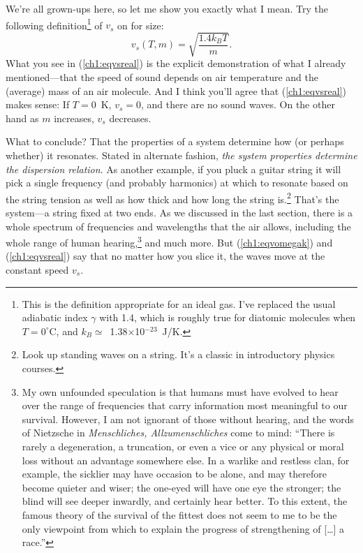 We're all grown-ups here, so let me show you exactly what I mean. Try
the following definition\footnote{This is the definition appropriate for an
  ideal gas. I've replaced the usual adiabatic index $\gamma$ with 1.4, which is
  roughly true for diatomic molecules when $T = 0 ^{\circ}$C, and
  $k_B \simeq$~1.38$\times$10$^{-23}$~J/K.} of $v_s$ on for size:
\begin{equation}
  \label{ch1:eqvsreal}
  v_s (T,m) = \sqrt{\dfrac{1.4 k_B T}{m}}.
\end{equation}
What you see in (\ref{ch1:eqvsreal}) is the explicit demonstration of what I
already mentioned---that the speed of sound depends on air temperature and the
(average) mass of an air molecule. And I think you'll agree that
(\ref{ch1:eqvsreal}) makes sense: If $T = 0$~K, $v_s = 0$, and there are no
sound waves. On the other hand as $m$ increases, $v_s$ decreases.

What to conclude? That the properties of a system determine how (or perhaps
whether) it resonates. Stated in alternate fashion, \emph{the system properties
  determine the dispersion relation}. As another example, if you pluck a guitar
string it will pick a single frequency (and probably harmonics) at which to
resonate based on the string tension as well as how thick and how long the
string is.\footnote{Look up standing waves on a string. It's a classic in
  introductory physics courses.} That's the system---a string fixed at two
ends. As we discussed in the last section, there is a whole spectrum of
frequencies and wavelengths that the air allows, including the whole range of
human hearing,\footnote{My own unfounded speculation is that humans must have
  evolved to hear over the range of frequencies that carry information most
  meaningful to our survival. However, I am not ignorant of those without
  hearing, and the words of Nietzsche in \textit{Menschliches,
    Allzumenschliches} come to mind: ``There is rarely a degeneration, a
  truncation, or even a vice or any physical or moral loss without an advantage
  somewhere else. In a warlike and restless clan, for example, the sicklier may
  have occasion to be alone, and may therefore become quieter and wiser; the
  one-eyed will have one eye the stronger; the blind will see deeper inwardly,
  and certainly hear better. To this extent, the famous theory of the survival
  of the fittest does not seem to me to be the only viewpoint from which to
  explain the progress of strengthening of [\dots] a race.''} and much more. But
(\ref{ch1:eqvomegak}) and (\ref{ch1:eqvsreal}) say that no matter how
you slice it, the waves move at the constant speed $v_s$.

